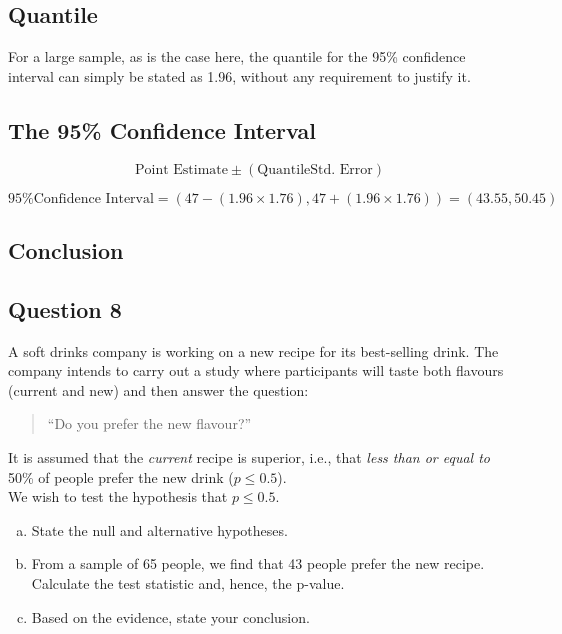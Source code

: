 \documentclass[]{report}
\begin{document}
\vspace{0.1cm}

\subsection*{Quantile}
For a large sample, as is the case here, the quantile for the 95\% confidence interval can simply be stated as 1.96, without any requirement to justify it.

\subsection*{The 95\% Confidence Interval}

\[ \mbox{Point Estimate} \pm \left( \mbox{Quantile} \mbox{Std. Error} \right) \]

\[\mbox{95\% Confidence Interval} = (47 - (1.96 \times 1.76), 47 + (1.96 \times 1.76) ) = (43.55,50.45) \]

\subsection*{Conclusion}

\newpage


\subsection*{Question 8}
A soft drinks company is working on a new recipe for its best-selling drink. The company intends to carry out a study where participants will taste both flavours (current and new) and then answer the question:
\begin{quotation}
	``Do you prefer the new flavour?''
\end{quotation}
It is assumed that the \emph{current} recipe is superior, i.e., that \emph{less than or equal to} 50\% of people prefer the new drink ($p \le 0.5$).\\[0.4cm]
We wish to test the hypothesis that $p \le 0.5$.\\[-0.2cm]

\begin{enumerate}[(a)]
\item State the null and alternative hypotheses. 
\item From a sample of 65 people, we find that 43 people prefer the new recipe. Calculate the test statistic and, hence, the p-value. 
\item Based on the evidence, state your conclusion.
\end{enumerate}
\end{document}
